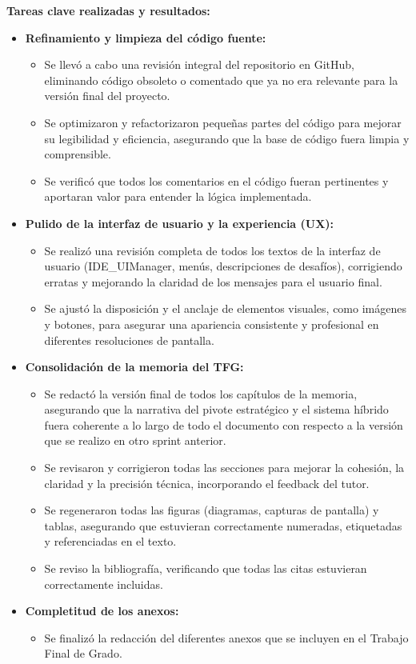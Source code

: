 \item \textbf{Tareas clave realizadas y resultados:}
\begin{itemize}
	\item \textbf{Refinamiento y limpieza del código fuente:}
	\begin{itemize}
		\item Se llevó a cabo una revisión integral del repositorio en GitHub, eliminando código obsoleto o comentado que ya no era relevante para la versión final del proyecto.
		\item Se optimizaron y refactorizaron pequeñas partes del código para mejorar su legibilidad y eficiencia, asegurando que la base de código fuera limpia y comprensible.
		\item Se verificó que todos los comentarios en el código fueran pertinentes y aportaran valor para entender la lógica implementada.
	\end{itemize}
	
	\item \textbf{Pulido de la interfaz de usuario y la experiencia (UX):}
	\begin{itemize}
		\item Se realizó una revisión completa de todos los textos de la interfaz de usuario (IDE\_UIManager, menús, descripciones de desafíos), corrigiendo erratas y mejorando la claridad de los mensajes para el usuario final.
		\item Se ajustó la disposición y el anclaje de elementos visuales, como imágenes y botones, para asegurar una apariencia consistente y profesional en diferentes resoluciones de pantalla.
	\end{itemize}
	
	\item \textbf{Consolidación de la memoria del TFG:}
	\begin{itemize}
		\item Se redactó la versión final de todos los capítulos de la memoria, asegurando que la narrativa del pivote estratégico y el sistema híbrido fuera coherente a lo largo de todo el documento con respecto a la versión que se realizo en otro sprint anterior.
		\item Se revisaron y corrigieron todas las secciones para mejorar la cohesión, la claridad y la precisión técnica, incorporando el feedback del tutor.
		\item Se regeneraron todas las figuras (diagramas, capturas de pantalla) y tablas, asegurando que estuvieran correctamente numeradas, etiquetadas y referenciadas en el texto.
		\item Se reviso  la bibliografía, verificando que todas las citas estuvieran correctamente incluidas.
	\end{itemize}
	
	\item \textbf{Completitud de los anexos:}
	\begin{itemize}
		\item Se finalizó la redacción del diferentes anexos que se incluyen en el Trabajo Final de Grado.
	\end{itemize}
\end{itemize}


